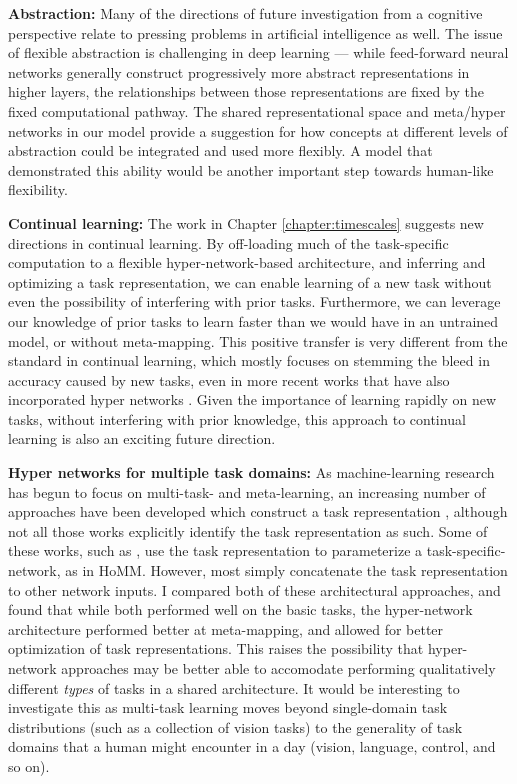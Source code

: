 \textbf{Abstraction:} Many of the directions of future investigation from a cognitive perspective relate to pressing problems in artificial intelligence as well. The issue of flexible abstraction is challenging in deep learning --- while feed-forward neural networks generally construct progressively more abstract representations in higher layers, the relationships between those representations are fixed by the fixed computational pathway. The shared representational space and meta/hyper networks in our model provide a suggestion for how concepts at different levels of abstraction could be integrated and used more flexibly. A model that demonstrated this ability would be another important step towards human-like flexibility. \par 

\textbf{Continual learning:} The work in Chapter \ref{chapter:timescales} suggests new directions in continual learning. By off-loading much of the task-specific computation to a flexible hyper-network-based architecture, and inferring and optimizing a task representation, we can enable learning of a new task without even the possibility of interfering with prior tasks. Furthermore, we can leverage our knowledge of prior tasks to learn faster than we would have in an untrained model, or without meta-mapping. This positive transfer is very different from the standard in continual learning, which mostly focuses on stemming the bleed in accuracy caused by new tasks, even in more recent works that have also incorporated hyper networks \citep{Oswald2020}. Given the importance of learning rapidly on new tasks, without interfering with prior knowledge, this approach to continual learning is also an exciting future direction. \par 

\textbf{Hyper networks for multiple task domains:} As machine-learning research has begun to focus on multi-task- and meta-learning, an increasing number of approaches have been developed which construct a task representation \citep{Hermann2017, Zintgraf2018, Rusu2019}, although not all those works explicitly identify the task representation as such. Some of these works, such as  \citet{Rusu2019}, use the task representation to parameterize a task-specific-network, as in HoMM. However, most simply concatenate the task representation to other network inputs. I compared both of these architectural approaches, and found that while both performed well on the basic tasks, the hyper-network architecture performed better at meta-mapping, and allowed for better optimization of task representations. This raises the possibility that hyper-network approaches may be better able to accomodate performing qualitatively different \emph{types} of tasks in a shared architecture. It would be interesting to investigate this as multi-task learning moves beyond single-domain task distributions (such as a collection of vision tasks) to the generality of task domains that a human might encounter in a day (vision, language, control, and so on). 

